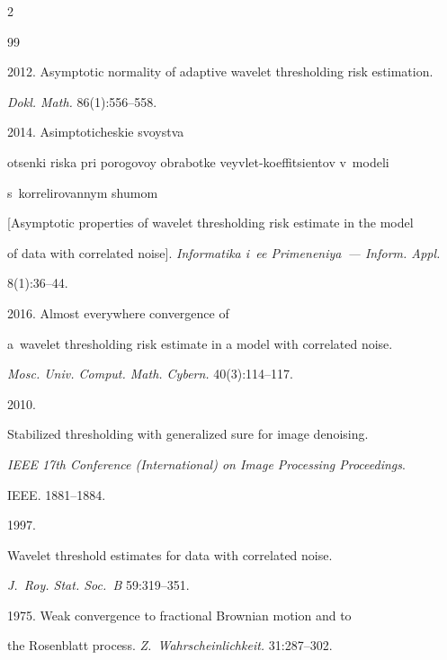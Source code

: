 \begin{multicols}{2}
{{\begin{thebibliography}{99}


 2012. Asymptotic normality of adaptive wavelet thresholding risk estimation. 

 \textit{Dokl. Math.} 86(1):556--558.




 2014. Asimptoticheskie svoystva 

otsenki riska pri porogovoy obrabotke veyvlet-koeffitsientov v~modeli 

s~korrelirovannym shumom

[Asymptotic properties of wavelet thresholding risk estimate in the model 

of data with correlated noise]. \textit{Informatika i~ee Primeneniya~--- Inform. Appl.}

8(1):36--44.




 2016. Almost everywhere convergence of 

a~wavelet thresholding risk estimate in a model with correlated noise. 

\textit{Mosc. Univ. Comput. Math. Cybern.} 40(3):114--117.




 2010. 

Stabilized thresholding with generalized sure for image denoising. 

\textit{IEEE 17th Conference (International) on Image Processing Proceedings}. 

IEEE. 1881--1884.




 1997.  

Wavelet threshold estimates for data with correlated noise. 

\textit{J.~Roy. Stat. Soc.~B} 59:319--351.




 1975.  Weak convergence to fractional Brownian motion and to 

the Rosenblatt process. \textit{Z.~Wahrscheinlichkeit.} 31:287--302.




\end{thebibliography}}}
\end{multicols}
